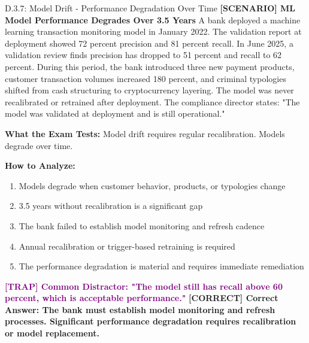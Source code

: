 \documentclass[11pt,a4paper]{beamer}
\newcommand{\trap}[1]{\textcolor{purple}{\textbf{[TRAP] #1}}}
\newcommand{\correct}[1]{\textcolor{green!50!black}{\textbf{[CORRECT] #1}}}
\newcommand{\scenario}[1]{\textcolor{blue!70!black}{\textbf{[SCENARIO] #1}}}
\begin{document}
\begin{frame}{D.3.7: Model Drift - Performance Degradation Over Time}
	\scenario{ML Model Performance Degrades Over 3.5 Years}
	A bank deployed a machine learning transaction monitoring model in January 2022. The validation report at deployment showed 72 percent precision and 81 percent recall. In June 2025, a validation review finds precision has dropped to 51 percent and recall to 62 percent. During this period, the bank introduced three new payment products, customer transaction volumes increased 180 percent, and criminal typologies shifted from cash structuring to cryptocurrency layering. The model was never recalibrated or retrained after deployment. The compliance director states: "The model was validated at deployment and is still operational."
	
	\vspace{0.1cm}
	\textbf{What the Exam Tests:} Model drift requires regular recalibration. Models degrade over time.
	
	\vspace{0.1cm}
	\textbf{How to Analyze:}
	\begin{enumerate}
		\item Models degrade when customer behavior, products, or typologies change
		\item 3.5 years without recalibration is a significant gap
		\item The bank failed to establish model monitoring and refresh cadence
		\item Annual recalibration or trigger-based retraining is required
		\item The performance degradation is material and requires immediate remediation
	\end{enumerate}
	
	\trap{Common Distractor: "The model still has recall above 60 percent, which is acceptable performance."}
	\correct{Correct Answer: The bank must establish model monitoring and refresh processes. Significant performance degradation requires recalibration or model replacement.}
\end{frame}
\end{document}
